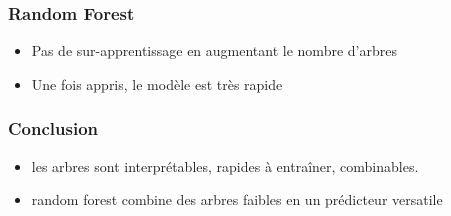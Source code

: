 \begin{frame}
  \frametitle{Random Forest}
  \begin{itemize}
  \item Pas de sur-apprentissage en augmentant le nombre d'arbres
  \item Une fois appris, le modèle est très rapide
  \end{itemize}
\end{frame}

\begin{frame}
  \frametitle{Conclusion}
  \begin{itemize}
  \item les arbres sont interprétables, rapides à entraîner,
    combinables.
  \item random forest combine des arbres faibles en un prédicteur
    versatile
  \end{itemize}
\end{frame}

